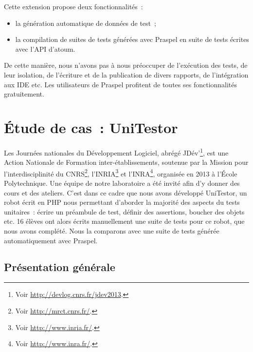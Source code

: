 Cette extension propose deux fonctionnalités~:
%
\begin{itemize}

\item la génération automatique de données de test~;

\item la compilation de suites de tests générées avec Praspel en suite de tests
écrites avec l'API d'atoum.

\end{itemize}

De cette manière, nous n'avons pas à nous préoccuper de l'exécution des tests,
de leur isolation, de l'écriture et de la publication de divers rapports, de
l'intégration aux IDE etc. Les utilisateurs de Praspel profitent de toutes ses
fonctionnalités gratuitement.

\section{Étude de cas~: UniTestor}
\label{section:experimentation:unitestor}

Les Journées nationales du Développement Logiciel, abrégé JDév'\footnote{Voir
\url{http://devlog.cnrs.fr/jdev2013}.}, est une Action Nationale de Formation
inter-établissements, soutenue par la Mission pour l'interdisciplinité du
CNRS\footnote{Voir \url{http://mrct.cnrs.fr/}.}, l'INRIA\footnote{Voir
\url{http://www.inria.fr/}.} et l'INRA\footnote{Voir
\url{http://www.inra.fr/}.}, organisée en 2013 à l'École Polytechnique. Une
équipe de notre laboratoire a été invité afin d'y donner des cours et des
ateliers. C'est dans ce cadre que nous avons développé UniTestor, un robot écrit
en PHP nous permettant d'aborder la majorité des aspects du tests unitaires~:
écrire un préambule de test, définir des assertions, boucher des objets etc. 16
élèves ont alors écrits manuellement une suite de tests pour ce robot, que nous
avons complété. Nous la comparons avec une suite de tests générée
automatiquement avec Praspel.

\subsection{Présentation générale}

